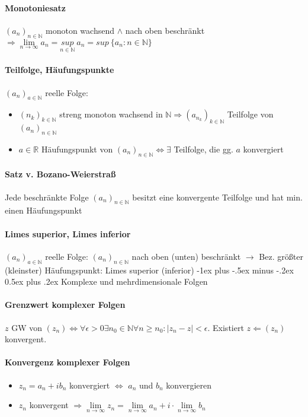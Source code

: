 \documentclass[paper=a4,paper=landscape, fontsize=6pt,DIV=25, twoside]{scrartcl}
\makeatletter
\newcommand{\real}{{\mathbb{R}}}
\newcommand{\nat}{\mathbb{N}}
\newcommand{\aseq}{(a_n)_{n \in \nat}}
\renewcommand{\section}{\@startsection{section}{1}{0mm}%
                                {-1ex plus -.5ex minus -.2ex}%
                                {0.5ex plus .2ex}%
                                {\normalfont\large\bfseries}}
\makeatother
\begin{document}
\begin{multicols*}{4}
		\paragraph{Monotoniesatz}
			$\aseq$ monoton wachsend $\wedge$ nach oben beschränkt $\Rightarrow \lim\limits_{n \rightarrow \infty} a_n = \underset{n \in \nat}{sup}\:a_n = sup\:\{a_n:n \in \nat\}$
		\paragraph{Teilfolge, Häufungspunkte}
			$(a_n)_{a \in \nat}$ reelle Folge:
			\begin{itemize}
			\item $(n_k)_{k \in \nat}$ streng monoton wachsend in $\nat \Rightarrow (a_{n_k})_{k \in \nat}$ Teilfolge von $\aseq$
			\item $a \in \real$ Häufungspunkt von $\aseq \Leftrightarrow \exists$ Teilfolge, die gg. $a$ konvergiert
			\end{itemize}
		\paragraph{Satz v. Bozano-Weierstraß}
		Jede beschränkte Folge $\aseq$ besitzt eine konvergente Teilfolge und hat min. einen Häufungspunkt
		\paragraph{Limes superior, Limes inferior}
		$(a_n)_{a \in \nat}$ reelle Folge: $\aseq$ nach oben (unten) beschränkt $\rightarrow$ Bez. größter (kleinster) Häufungspunkt: Limes superior (inferior)
	\section{Komplexe und mehrdimensionale Folgen}
		\paragraph{Grenzwert komplexer Folgen}
		$z$ GW von $(z_n) \Leftrightarrow \forall \epsilon > 0 \exists n_0 \in \nat \forall n \geq n_0: |z_n - z| < \epsilon$. Existiert $z \Leftarrow (z_n)$ konvergent.
		\paragraph{Konvergenz komplexer Folgen}
		\begin{itemize}
			\item $z_n = a_n + ib_n$ konvergiert $\Leftrightarrow$ $a_n$ und $b_n$ konvergieren
			\item $z_n$ konvergent $\Rightarrow \lim\limits_{n \rightarrow \infty} z_n = \lim\limits_{n \rightarrow \infty} a_n + i \cdot \lim\limits_{n \rightarrow \infty} b_n$
		\end{itemize}

\end{multicols*}
\end{document}

